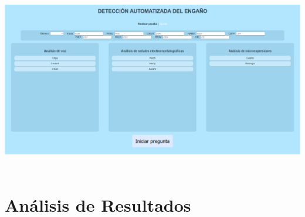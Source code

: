 \begin{center}
\includegraphics[height=3.15in]{figuras/Imagen20.PNG}
\end{center}



\chapter{Análisis de Resultados}





